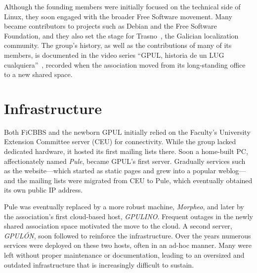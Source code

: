 Although the founding members were initially focused on the technical
side of Linux, they soon engaged with the broader Free Software
movement. Many became contributors to projects such as Debian and the
Free Software Foundation, and they also set the stage for
Trasno~\cite{Trasno}, the Galician localization community. The group's
history, as well as the contributions of many of its members, is
documented in the video series ``GPUL, historia de un LUG
cualquiera''~\cite{GPULserie}, recorded when the association moved from
its long-standing office to a new shared space.

\section{Infrastructure}

Both FiCBBS and the newborn GPUL initially relied on the Faculty's
University Extension Committee server (CEU) for connectivity. While the
group lacked dedicated hardware, it hosted its first mailing lists there.
Soon a home-built PC, affectionately named \emph{Pule}, became GPUL's
first server. Gradually services such as the website---which started as
static pages and grew into a popular weblog---and the mailing lists were
migrated from CEU to Pule, which eventually obtained its own public IP
address.

Pule was eventually replaced by a more robust machine, \emph{Morpheo},
and later by the association's first cloud-based host, \emph{GPULINO}.
Frequent outages in the newly shared association space motivated the
move to the cloud. A second server, \emph{GPUL\'ON}, soon followed to
reinforce the infrastructure. Over the years numerous services were
deployed on these two hosts, often in an ad-hoc manner. Many were left
without proper maintenance or documentation, leading to an oversized and
outdated infrastructure that is increasingly difficult to sustain.

